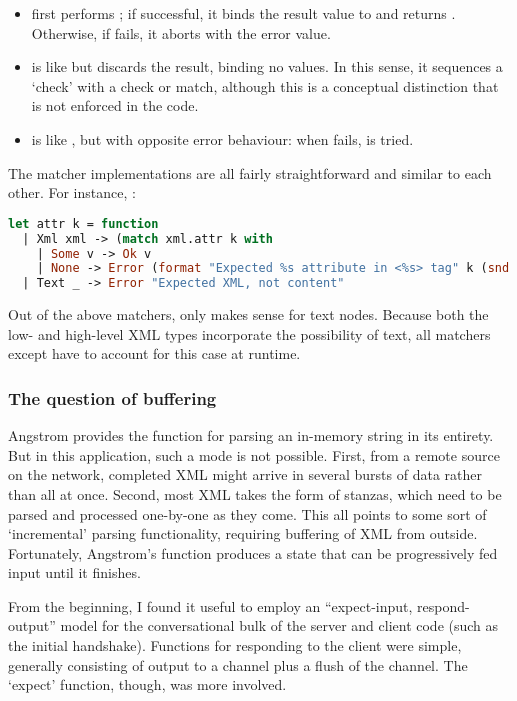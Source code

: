 \documentclass[12pt,a4paper,twoside,openright]{report}
\begin{document}
{\begin{itemize}
  \item {} first performs ; if successful, it binds the result value to  and returns . Otherwise, if  fails, it aborts with the error value.

  \item {} is like \code{>>=} but discards the result, binding no values. In this sense, it sequences a `check' with a check or match, although this is a conceptual distinction that is not enforced in the code.

  \item {} is like \code{*>}, but with opposite error behaviour: when  fails,  is tried.
\end{itemize}

The matcher implementations are all fairly straightforward and similar to each other. For instance, :

\begin{lstlisting}[language=ml]
let attr k = function
  | Xml xml -> (match xml.attr k with
    | Some v -> Ok v
    | None -> Error (format "Expected %s attribute in <%s> tag" k (snd xml.tag)) )
  | Text _ -> Error "Expected XML, not content"
\end{lstlisting}

Out of the above matchers, only  makes sense for text nodes. Because both the low- and high-level XML types incorporate the possibility of text, all matchers except  have to account for this case at runtime.

\subsubsection{The question of buffering}
Angstrom provides the  function for parsing an in-memory string in its entirety. But in this application, such a mode is not possible. First, from a remote source on the network, completed XML might arrive in several bursts of data rather than all at once. Second, most XML takes the form of stanzas, which need to be parsed and processed one-by-one as they come. This all points to some sort of `incremental' parsing functionality, requiring buffering of XML from outside. Fortunately, Angstrom's  function produces a state that can be progressively fed input until it finishes.

From the beginning, I found it useful to employ an ``expect-input, respond-output'' model for the conversational bulk of the server and client code (such as the initial handshake). Functions for responding to the client were simple, generally consisting of output to a channel plus a flush of the channel. The `expect' function, though, was more involved.

}
\end{document}
